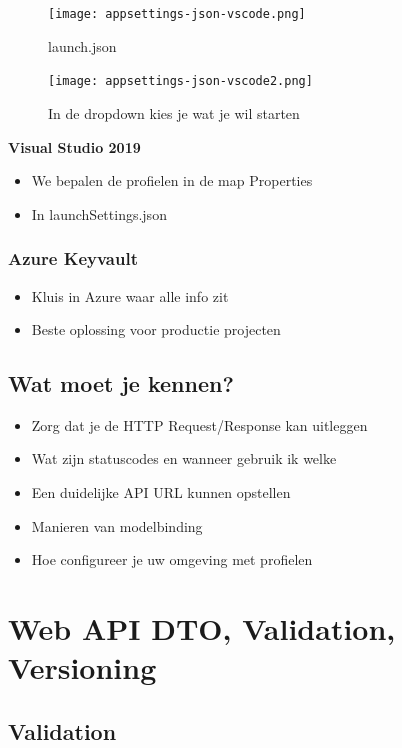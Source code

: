 \documentclass{article}
\begin{document}
\begin{figure}[H]
    \centering
    \texttt{[image: appsettings-json-vscode.png]}
    \caption{launch.json}
\end{figure}

\begin{figure}[H]
    \centering
    \texttt{[image: appsettings-json-vscode2.png]}
    \caption{In de dropdown kies je wat je wil starten}
\end{figure}


\textbf{Visual Studio 2019}

\begin{itemize}
    \item We bepalen de profielen in de map Properties
    \item In launchSettings.json
\end{itemize}

\subsubsection{Azure Keyvault}

\begin{itemize}
    \item Kluis in Azure waar alle info zit
    \item Beste oplossing voor productie projecten
\end{itemize}

\subsection{Wat moet je kennen?}

\begin{itemize}
    \item Zorg dat je de HTTP Request/Response kan uitleggen
    \item Wat zijn statuscodes en wanneer gebruik ik welke
    \item Een duidelijke API URL kunnen opstellen
    \item Manieren van modelbinding
    \item Hoe configureer je uw omgeving met profielen
\end{itemize}

\section{Web API DTO, Validation, Versioning}

\subsection{Validation}
\end{document}
